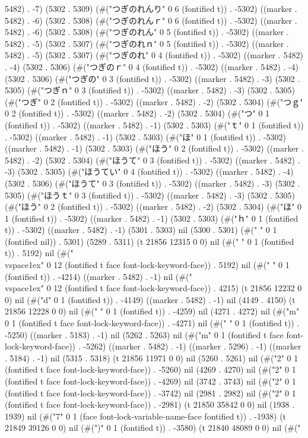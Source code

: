 5482) . -7) (5302 . 5309) (#("つぎのれんり" 0 6 (fontified t)) . -5302) ((marker . 5482) . -6) (5302 . 5308) (#("つぎのれんｒ" 0 6 (fontified t)) . -5302) ((marker . 5482) . -6) (5302 . 5308) (#("つぎのれん" 0 5 (fontified t)) . -5302) ((marker . 5482) . -5) (5302 . 5307) (#("つぎのれｎ" 0 5 (fontified t)) . -5302) ((marker . 5482) . -5) (5302 . 5307) (#("つぎのれ" 0 4 (fontified t)) . -5302) ((marker . 5482) . -4) (5302 . 5306) (#("つぎのｒ" 0 4 (fontified t)) . -5302) ((marker . 5482) . -4) (5302 . 5306) (#("つぎの" 0 3 (fontified t)) . -5302) ((marker . 5482) . -3) (5302 . 5305) (#("つぎｎ" 0 3 (fontified t)) . -5302) ((marker . 5482) . -3) (5302 . 5305) (#("つぎ" 0 2 (fontified t)) . -5302) ((marker . 5482) . -2) (5302 . 5304) (#("つｇ" 0 2 (fontified t)) . -5302) ((marker . 5482) . -2) (5302 . 5304) (#("つ" 0 1 (fontified t)) . -5302) ((marker . 5482) . -1) (5302 . 5303) (#("ｔ" 0 1 (fontified t)) . -5302) ((marker . 5482) . -1) (5302 . 5303) (#("ほ" 0 1 (fontified t)) . -5302) ((marker . 5482) . -1) (5302 . 5303) (#("ほう" 0 2 (fontified t)) . -5302) ((marker . 5482) . -2) (5302 . 5304) (#("ほうて" 0 3 (fontified t)) . -5302) ((marker . 5482) . -3) (5302 . 5305) (#("ほうてい" 0 4 (fontified t)) . -5302) ((marker . 5482) . -4) (5302 . 5306) (#("ほうて" 0 3 (fontified t)) . -5302) ((marker . 5482) . -3) (5302 . 5305) (#("ほうｔ" 0 3 (fontified t)) . -5302) ((marker . 5482) . -3) (5302 . 5305) (#("ほう" 0 2 (fontified t)) . -5302) ((marker . 5482) . -2) (5302 . 5304) (#("ほ" 0 1 (fontified t)) . -5302) ((marker . 5482) . -1) (5302 . 5303) (#("ｈ" 0 1 (fontified t)) . -5302) ((marker . 5482) . -1) (5301 . 5303) nil (5300 . 5301) (#(" " 0 1 (fontified nil)) . 5301) (5289 . 5311) (t 21856 12315 0 0) nil (#("
" 0 1 (fontified t)) . 5192) nil (#("\\vspace{1ex}" 0 12 (fontified t face font-lock-keyword-face)) . 5192) nil (#("
" 0 1 (fontified t)) . -4214) ((marker . 5482) . -1) nil (#("\\vspace{1ex}" 0 12 (fontified t face font-lock-keyword-face)) . 4215) (t 21856 12232 0 0) nil (#("d" 0 1 (fontified t)) . -4149) ((marker . 5482) . -1) nil (4149 . 4150) (t 21856 12228 0 0) nil (#("
" 0 1 (fontified t)) . -4259) nil (4271 . 4272) nil (#("m" 0 1 (fontified t face font-lock-keyword-face)) . -4271) nil (#("
" 0 1 (fontified t)) . -5250) ((marker . 5183) . -1) nil (5262 . 5263) nil (#("m" 0 1 (fontified t face font-lock-keyword-face)) . -5262) ((marker . 5482) . -1) ((marker . 5296) . -1) ((marker . 5184) . -1) nil (5315 . 5318) (t 21856 11971 0 0) nil (5260 . 5261) nil (#("2" 0 1 (fontified t face font-lock-keyword-face)) . -5260) nil (4269 . 4270) nil (#("2" 0 1 (fontified t face font-lock-keyword-face)) . -4269) nil (3742 . 3743) nil (#("2" 0 1 (fontified t face font-lock-keyword-face)) . -3742) nil (2981 . 2982) nil (#("2" 0 1 (fontified t face font-lock-keyword-face)) . -2981) (t 21850 35842 0 0) nil (1938 . 1939) nil (#("7" 0 1 (face font-lock-variable-name-face fontified t)) . -1938) (t 21849 39126 0 0) nil (#(")" 0 1 (fontified t)) . -3580) (t 21840 48089 0 0) nil (#("
